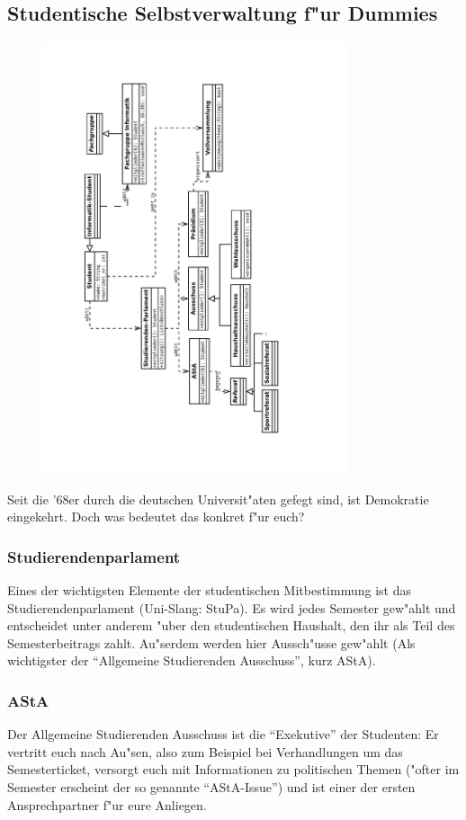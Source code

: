 \subsection{Studentische Selbstverwaltung f"ur Dummies}

\begin{figure}[b]
  \centering\includegraphics[width=0.8\textwidth,angle=270]{bilder/gremienkunde2.pdf}
\end{figure}

Seit die '68er durch die deutschen Universit"aten gefegt sind, ist Demokratie eingekehrt.
Doch was bedeutet das konkret f"ur euch?
\subsubsection*{Studierendenparlament}
Eines der wichtigsten Elemente der studentischen Mitbestimmung ist das Studierendenparlament (Uni-Slang: StuPa).
Es wird jedes Semester gew"ahlt und entscheidet unter anderem "uber den studentischen Haushalt, den ihr als Teil des Semesterbeitrags zahlt.
Au"serdem werden hier Aussch"usse gew"ahlt (Als wichtigster der "`Allgemeine Studierenden Ausschuss"', kurz AStA).
\subsubsection*{AStA}
Der Allgemeine Studierenden Ausschuss ist die "`Exekutive"' der Studenten:
Er vertritt euch nach Au"sen, also zum Beispiel bei Verhandlungen um das Semesterticket, versorgt euch mit Informationen zu politischen Themen ("ofter im Semester erscheint der so genannte "`AStA-Issue"') und ist einer der ersten Ansprechpartner f"ur eure Anliegen.
